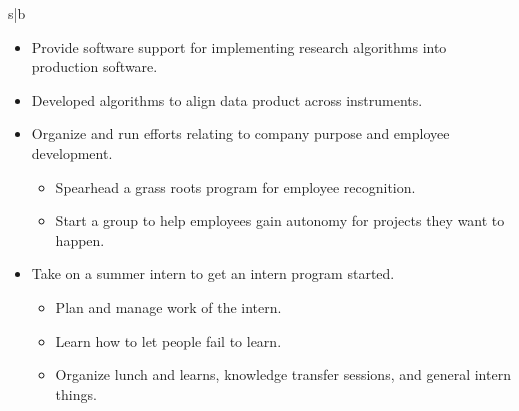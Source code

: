 \documentclass[a4paper,10pt]{article}
\begin{document}
\begin{tabularx}{\textwidth}{s|b}
\begin{itemize}[leftmargin=20pt,topsep=1pt,itemsep=1pt,partopsep=0pt, parsep=1pt]
\begin{itemize}[leftmargin=20pt,topsep=1pt,itemsep=1pt,partopsep=0pt, parsep=1pt]
                \item Support its use on site for ongoing manufacture of company products.
                \item Assess work needed to go from MVP hybrid use to full use.
                \item Own this work and its pre-release validation.
                \item Over see the validation and deployment of the new procedure.
            \end{itemize}
        \item Provide software support for implementing research algorithms into production software.
        \item Developed algorithms to align data product across instruments.
        \item Organize and run efforts relating to company purpose and employee development.
            \begin{itemize}[leftmargin=20pt,topsep=1pt,itemsep=1pt,partopsep=0pt, parsep=1pt]
                \item Spearhead a grass roots program for employee recognition.
                \item Start a group to help employees gain autonomy for projects they want to happen.
            \end{itemize}
        \item Take on a summer intern to get an intern program started.
            \begin{itemize}[leftmargin=20pt,topsep=1pt,itemsep=1pt,partopsep=0pt, parsep=1pt]
                \item Plan and manage work of the intern.
                \item Learn how to let people fail to learn.
                \item Organize lunch and learns, knowledge transfer sessions, and general intern things.
            \end{itemize}
    \end{itemize}\\
\end{tabularx}
\end{document}
